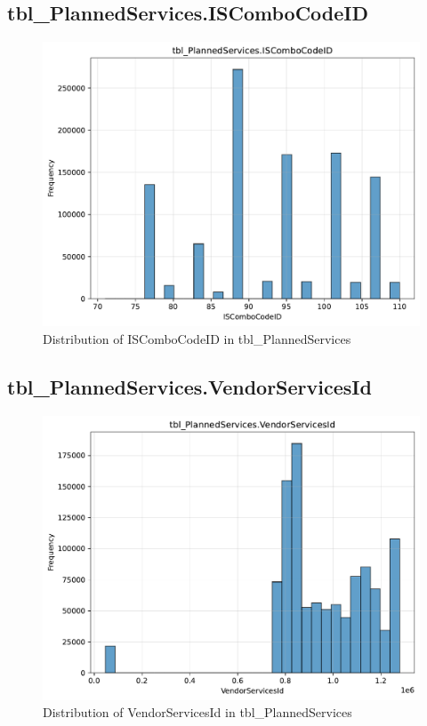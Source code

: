 \subsection{tbl\_PlannedServices.ISComboCodeID}

\begin{figure}[htbp]
\centering
\includegraphics[width=\textwidth]{figures/dbo_tbl_PlannedServices_ISComboCodeID.pdf}
\caption{Distribution of ISComboCodeID in tbl\_PlannedServices}
\end{figure}\newpage

\subsection{tbl\_PlannedServices.VendorServicesId}

\begin{figure}[htbp]
\centering
\includegraphics[width=\textwidth]{figures/dbo_tbl_PlannedServices_VendorServicesId.pdf}
\caption{Distribution of VendorServicesId in tbl\_PlannedServices}
\end{figure}\newpage

